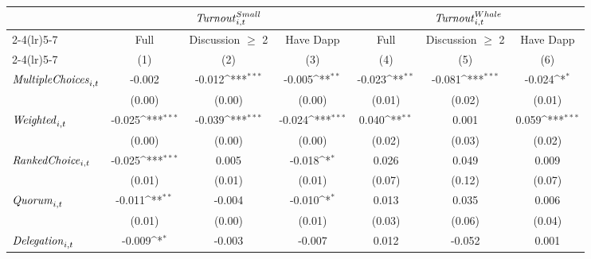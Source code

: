 {
\def\sym#1{\ifmmode^{#1}\else\(^{#1}\)\fi}
\begin{tabular}{l*{6}{c}}
\toprule
                    &\multicolumn{3}{c}{${\it Turnout}^{Small}_{i,t}$}                &\multicolumn{3}{c}{${\it Turnout}^{Whale}_{i,t}$}                \\\cmidrule(lr){2-4}\cmidrule(lr){5-7}
                    &\multicolumn{1}{c}{Full}&\multicolumn{1}{c}{Discussion $\geq$ 2}&\multicolumn{1}{c}{Have Dapp}&\multicolumn{1}{c}{Full}&\multicolumn{1}{c}{Discussion $\geq$ 2}&\multicolumn{1}{c}{Have Dapp}\\
\cmidrule(lr){2-4}\cmidrule(lr){5-7} &\multicolumn{1}{c}{(1)}&\multicolumn{1}{c}{(2)}&\multicolumn{1}{c}{(3)}&\multicolumn{1}{c}{(4)}&\multicolumn{1}{c}{(5)}&\multicolumn{1}{c}{(6)}\\\midrule
${\it Multiple Choices}_{i,t}$&      -0.002         &      -0.012\sym{***}&      -0.005\sym{**} &      -0.023\sym{**} &      -0.081\sym{***}&      -0.024\sym{*}  \\
                    &      (0.00)         &      (0.00)         &      (0.00)         &      (0.01)         &      (0.02)         &      (0.01)         \\
${\it Weighted}_{i,t}$&      -0.025\sym{***}&      -0.039\sym{***}&      -0.024\sym{***}&       0.040\sym{**} &       0.001         &       0.059\sym{***}\\
                    &      (0.00)         &      (0.00)         &      (0.00)         &      (0.02)         &      (0.03)         &      (0.02)         \\
${\it Ranked Choice}_{i,t}$&      -0.025\sym{***}&       0.005         &      -0.018\sym{*}  &       0.026         &       0.049         &       0.009         \\
                    &      (0.01)         &      (0.01)         &      (0.01)         &      (0.07)         &      (0.12)         &      (0.07)         \\
${\it Quorum}_{i,t}$&      -0.011\sym{**} &      -0.004         &      -0.010\sym{*}  &       0.013         &       0.035         &       0.006         \\
                    &      (0.01)         &      (0.00)         &      (0.01)         &      (0.03)         &      (0.06)         &      (0.04)         \\
${\it Delegation}_{i,t}$&      -0.009\sym{*}  &      -0.003         &      -0.007         &       0.012         &      -0.052         &       0.001         \\

\end{tabular}}
